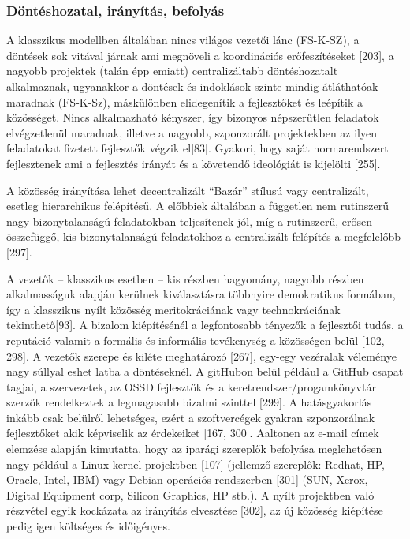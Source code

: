 \documentclass[12pt,magyar,a4paper,oneside]{scrreprt}
\begin{document}
\hypertarget{duxf6ntuxe9shozatal-iruxe1nyuxedtuxe1s-befolyuxe1s}{%
\subsubsection{Döntéshozatal, irányítás,
befolyás}\label{duxf6ntuxe9shozatal-iruxe1nyuxedtuxe1s-befolyuxe1s}}

A klasszikus modellben általában nincs világos vezetői lánc (FS-K-SZ), a
döntések sok vitával járnak ami megnöveli a koordinációs erőfeszítéseket
{[}203{]}, a nagyobb projektek (talán épp emiatt) centralizáltabb
döntéshozatalt alkalmaznak, ugyanakkor a döntések és indoklások szinte
mindig átláthatóak maradnak (FS-K-Sz), máskülönben elidegenítik a
fejlesztőket és leépítik a közösséget. Nincs alkalmazható kényszer, így
bizonyos népszerűtlen feladatok elvégzetlenül maradnak, illetve a
nagyobb, szponzorált projektekben az ilyen feladatokat fizetett
fejlesztők végzik el{[}83{]}. Gyakori, hogy saját normarendszert
fejlesztenek ami a fejlesztés irányát és a követendő ideológiát is
kijelölti {[}255{]}.

A közösség irányítása lehet decentralizált ``Bazár'' stílusú vagy
centralizált, esetleg hierarchikus felépítésű. A előbbiek általában a
független nem rutinszerű nagy bizonytalanságú feladatokban teljesítenek
jól, míg a rutinszerű, erősen összefüggő, kis bizonytalanságú
feladatokhoz a centralizált felépítés a megfelelőbb {[}297{]}.

A vezetők -- klasszikus esetben -- kis részben hagyomány, nagyobb
részben alkalmasságuk alapján kerülnek kiválasztásra többnyire
demokratikus formában, így a klasszikus nyílt közösség meritokráciának
vagy technokráciának tekinthető{[}93{]}. A bizalom kiépítésénél a
legfontosabb tényezők a fejlesztői tudás, a reputáció valamit a formális
és informális tevékenység a közösségen belül {[}102, 298{]}. A vezetők
szerepe és kiléte meghatározó {[}267{]}, egy-egy vezéralak véleménye
nagy súllyal eshet latba a döntéseknél. A gitHubon belül például a
GitHub csapat tagjai, a szervezetek, az OSSD fejlesztők és a
keretrendszer/progamkönyvtár szerzők rendelkeztek a legmagasabb bizalmi
szinttel {[}299{]}. A hatásgyakorlás inkább csak belülről lehetséges,
ezért a szoftvercégek gyakran szponzorálnak fejlesztőket akik képviselik
az érdekeiket {[}167, 300{]}. Aaltonen az e-mail címek elemzése alapján
kimutatta, hogy az iparági szereplők befolyása meglehetősen nagy például
a Linux kernel projektben {[}107{]} (jellemző szereplők: Redhat, HP,
Oracle, Intel, IBM) vagy Debian operációs rendszerben {[}301{]} (SUN,
Xerox, Digital Equipment corp, Silicon Graphics, HP stb.). A nyílt
projektben való részvétel egyik kockázata az irányítás elvesztése
{[}302{]}, az új közösség kiépítése pedig igen költséges és időigényes.
\end{document}
